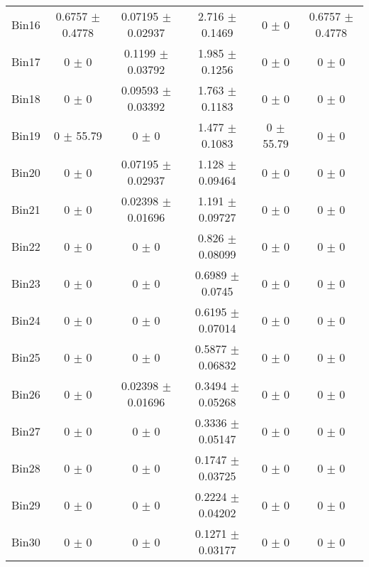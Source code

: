 \begin{tabular}{@{\extracolsep{4pt}}lccccc@{}}
     Bin16 & 0.6757 $\pm$ 0.4778 & 0.07195 $\pm$ 0.02937 & 2.716 $\pm$ 0.1469 & 0 $\pm$ 0 & 0.6757 $\pm$ 0.4778 \\ 
     Bin17 & 0 $\pm$ 0 & 0.1199 $\pm$ 0.03792 & 1.985 $\pm$ 0.1256 & 0 $\pm$ 0 & 0 $\pm$ 0 \\ 
     Bin18 & 0 $\pm$ 0 & 0.09593 $\pm$ 0.03392 & 1.763 $\pm$ 0.1183 & 0 $\pm$ 0 & 0 $\pm$ 0 \\ 
     Bin19 & 0 $\pm$ 55.79 & 0 $\pm$ 0 & 1.477 $\pm$ 0.1083 & 0 $\pm$ 55.79 & 0 $\pm$ 0 \\ 
     Bin20 & 0 $\pm$ 0 & 0.07195 $\pm$ 0.02937 & 1.128 $\pm$ 0.09464 & 0 $\pm$ 0 & 0 $\pm$ 0 \\ 
     Bin21 & 0 $\pm$ 0 & 0.02398 $\pm$ 0.01696 & 1.191 $\pm$ 0.09727 & 0 $\pm$ 0 & 0 $\pm$ 0 \\ 
     Bin22 & 0 $\pm$ 0 & 0 $\pm$ 0 & 0.826 $\pm$ 0.08099 & 0 $\pm$ 0 & 0 $\pm$ 0 \\ 
     Bin23 & 0 $\pm$ 0 & 0 $\pm$ 0 & 0.6989 $\pm$ 0.0745 & 0 $\pm$ 0 & 0 $\pm$ 0 \\ 
     Bin24 & 0 $\pm$ 0 & 0 $\pm$ 0 & 0.6195 $\pm$ 0.07014 & 0 $\pm$ 0 & 0 $\pm$ 0 \\ 
     Bin25 & 0 $\pm$ 0 & 0 $\pm$ 0 & 0.5877 $\pm$ 0.06832 & 0 $\pm$ 0 & 0 $\pm$ 0 \\ 
     Bin26 & 0 $\pm$ 0 & 0.02398 $\pm$ 0.01696 & 0.3494 $\pm$ 0.05268 & 0 $\pm$ 0 & 0 $\pm$ 0 \\ 
     Bin27 & 0 $\pm$ 0 & 0 $\pm$ 0 & 0.3336 $\pm$ 0.05147 & 0 $\pm$ 0 & 0 $\pm$ 0 \\ 
     Bin28 & 0 $\pm$ 0 & 0 $\pm$ 0 & 0.1747 $\pm$ 0.03725 & 0 $\pm$ 0 & 0 $\pm$ 0 \\ 
     Bin29 & 0 $\pm$ 0 & 0 $\pm$ 0 & 0.2224 $\pm$ 0.04202 & 0 $\pm$ 0 & 0 $\pm$ 0 \\ 
     Bin30 & 0 $\pm$ 0 & 0 $\pm$ 0 & 0.1271 $\pm$ 0.03177 & 0 $\pm$ 0 & 0 $\pm$ 0 \\ 
\hline\hline
  \end{tabular}
